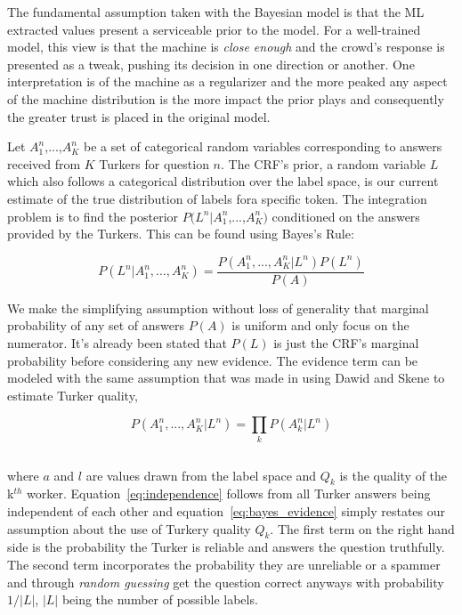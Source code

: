 The fundamental assumption taken with the Bayesian model is that the ML extracted values present a serviceable prior to the model.  For a well-trained model, this view is that the machine is \textit{close enough} and the crowd's response is presented as a tweak, pushing its decision in one direction or another.  One interpretation is of the machine as a regularizer and the more peaked any aspect of the machine distribution is the more impact the prior plays and consequently the greater trust is placed in the original model.

Let $A^{n}_{1}$,...,$A^{n}_{K}$ be a set of categorical random variables corresponding to answers received from $K$ Turkers for question $n$.  The CRF's prior, a random variable $L$ which also follows a categorical distribution over the label space, is our current estimate of the true distribution of labels fora specific token.  The integration problem is to find the posterior $P(L^{n}|A^{n}_{1}$,...,$A^{n}_{K})$ conditioned on the answers provided by the Turkers.  This can be found using Bayes's Rule:     

\begin{equation}
P(L^{n}|A^{n}_{1},...,A^{n}_{K}) = \frac{P(A^{n}_{1},...,A^{n}_{K}|L^{n})P(L^{n})}{P(A)}
\end{equation}

We make the simplifying assumption without loss of generality that marginal probability of any set of answers $P(A)$ is uniform and only focus on the numerator.  It's already been stated that $P(L)$ is just the CRF's marginal probability before considering any new evidence.  The evidence term can be modeled with the same assumption that was made in using Dawid and Skene to estimate Turker quality,

\begin{equation}
\label{eq:independence}
P(A^{n}_{1},...,A^{n}_{K}|L^{n}) = \prod_{k}P(A^{n}_{k}|L^{n})
\end{equation}

\begin{equation}
\label{eq:bayes_evidence}
\end{equation}

where $a$ and $l$ are values drawn from the label space and $Q_{k}$ is the quality of the k$^{th}$ worker.  Equation~\ref{eq:independence} follows from all Turker answers being independent of each other and equation~\ref{eq:bayes_evidence} simply restates our assumption about the use of Turkery quality $Q_{k}$.  The first term on the right hand side is the probability the Turker is reliable and answers the question truthfully.  The second term incorporates the probability they are unreliable or a spammer and through \textit{random guessing} get the question correct anyways with probability $1/|L|$, $|L|$ being the number of possible labels.
 
